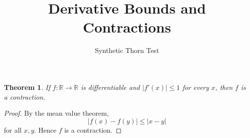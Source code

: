 \documentclass{article}
\newtheorem{theorem}{Theorem}
\begin{document}
\title{Derivative Bounds and Contractions}
\author{Synthetic Thorn Test}
\maketitle

\begin{theorem}\label{thm:too-strong}
If $f:\mathbb{R}\to\mathbb{R}$ is differentiable and $|f'(x)|\le1$ for every $x$, then $f$ is a contraction.
\end{theorem}
\begin{proof}
By the mean value theorem,
\[
|f(x)-f(y)|\le |x-y|
\]
for all $x,y$. Hence $f$ is a contraction.
\end{proof}
\end{document}
